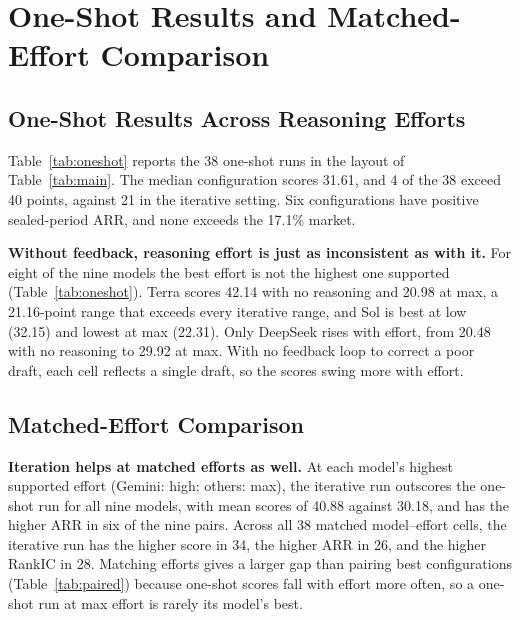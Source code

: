\section{One-Shot Results and Matched-Effort Comparison}
\label{app:oneshot}

\subsection{One-Shot Results Across Reasoning Efforts}

\begin{table}[!t]

\end{table}

Table~\ref{tab:oneshot} reports the 38 one-shot runs in the layout of Table~\ref{tab:main}. The median configuration scores 31.61, and 4 of the 38 exceed 40 points, against 21 in the iterative setting. Six configurations have positive sealed-period ARR, and none exceeds the 17.1\% market.

\noindent\textbf{Without feedback, reasoning effort is just as inconsistent as with it.} For eight of the nine models the best effort is not the highest one supported (Table~\ref{tab:oneshot}). Terra scores 42.14 with no reasoning and 20.98 at max, a 21.16-point range that exceeds every iterative range, and Sol is best at low (32.15) and lowest at max (22.31). Only DeepSeek rises with effort, from 20.48 with no reasoning to 29.92 at max. With no feedback loop to correct a poor draft, each cell reflects a single draft, so the scores swing more with effort.

\subsection{Matched-Effort Comparison}

\noindent\textbf{Iteration helps at matched efforts as well.} At each model's highest supported effort (Gemini: high; others: max), the iterative run outscores the one-shot run for all nine models, with mean scores of 40.88 against 30.18, and has the higher ARR in six of the nine pairs. Across all 38 matched model--effort cells, the iterative run has the higher score in 34, the higher ARR in 26, and the higher RankIC in 28. Matching efforts gives a larger gap than pairing best configurations (Table~\ref{tab:paired}) because one-shot scores fall with effort more often, so a one-shot run at max effort is rarely its model's best.
